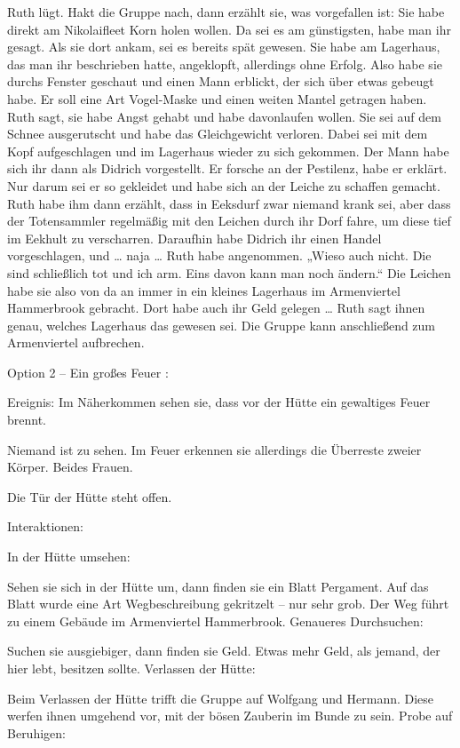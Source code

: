 Ruth lügt. Hakt die Gruppe nach, dann erzählt sie, was vorgefallen ist:
Sie habe direkt am Nikolaifleet Korn holen wollen. Da sei es am günstigsten, habe man ihr gesagt.
Als sie dort ankam, sei es bereits spät gewesen. Sie habe am Lagerhaus, das man ihr beschrieben hatte, angeklopft, allerdings ohne Erfolg.
Also habe sie durchs Fenster geschaut und einen Mann erblickt, der sich über etwas gebeugt habe. Er soll eine Art Vogel-Maske und einen weiten Mantel getragen haben.
Ruth sagt, sie habe Angst gehabt und habe davonlaufen wollen. Sie sei auf dem Schnee ausgerutscht und habe das Gleichgewicht verloren.
Dabei sei mit dem Kopf aufgeschlagen und im Lagerhaus wieder zu sich gekommen. Der Mann habe sich ihr dann als Didrich vorgestellt. Er forsche an der Pestilenz, habe er erklärt.
Nur darum sei er so gekleidet und habe sich an der Leiche zu schaffen gemacht. Ruth habe ihm dann erzählt, dass in Eeksdurf zwar niemand krank sei, aber dass der Totensammler regelmäßig mit den Leichen durch ihr Dorf fahre, um diese tief im Eekhult zu verscharren.
Daraufhin habe Didrich ihr einen Handel vorgeschlagen, und … naja … Ruth habe angenommen. „Wieso auch nicht. Die sind schließlich tot und ich arm. Eins davon kann man noch ändern.“
Die Leichen habe sie also von da an immer in ein kleines Lagerhaus im Armenviertel Hammerbrook gebracht. Dort habe auch ihr Geld gelegen …
Ruth sagt ihnen genau, welches Lagerhaus das gewesen sei. Die Gruppe kann anschließend zum Armenviertel aufbrechen.

Option 2 – Ein großes Feuer
:

Ereignis: Im Näherkommen sehen sie, dass vor der Hütte ein gewaltiges Feuer brennt.

Niemand ist zu sehen. Im Feuer erkennen sie allerdings die Überreste zweier Körper. Beides Frauen.

Die Tür der Hütte steht offen.

Interaktionen:

In der Hütte umsehen:

Sehen sie sich in der Hütte um, dann finden sie ein Blatt Pergament. Auf das Blatt wurde eine Art Wegbeschreibung gekritzelt – nur sehr grob. Der Weg führt zu einem Gebäude im Armenviertel Hammerbrook.
Genaueres Durchsuchen:

Suchen sie ausgiebiger, dann finden sie Geld. Etwas mehr Geld, als jemand, der hier lebt, besitzen sollte.
Verlassen der Hütte:

Beim Verlassen der Hütte trifft die Gruppe auf Wolfgang und Hermann. Diese werfen ihnen umgehend vor, mit der bösen Zauberin im Bunde zu sein.
Probe auf Beruhigen:

